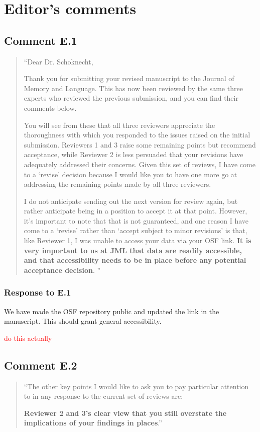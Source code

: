 \documentclass[12pt]{article}
\begin{document}
\section*{Editor's comments} 
\subsection*{Comment E.1}
\begin{quote}
``Dear Dr. Schoknecht,

Thank you for submitting your revised manuscript to the Journal of Memory and Language. This has now been reviewed by the same three experts who reviewed the previous submission, and you can find their comments below.

You will see from these that all three reviewers appreciate the thoroughness with which you responded to the issues raised on the initial submission. Reviewers 1 and 3 raise some remaining points but recommend acceptance, while Reviewer 2 is less persuaded that your revisions have adequately addressed their concerns. Given this set of reviews, I have come to a `revise' decision because I would like you to have one more go at addressing the remaining points made by all three reviewers.

I do not anticipate sending out the next version for review again, but rather anticipate being in a position to accept it at that point. However, it's important to note that that is not guaranteed, and one reason I have come to a `revise' rather than `accept subject to minor revisions' is that, like Reviewer 1, I was unable to access your data via your OSF link. \textbf{It is very important to us at JML that data are readily accessible, and that accessibility needs to be in place before any potential acceptance decision}. 
''
\end{quote}

\subsubsection*{Response to E.1}
We have made the OSF repository public and updated the link in the manuscript. This should grant general accessibility.

\textcolor{red}{do this actually} 


\subsection*{Comment E.2}
\begin{quote}
``The other key points I would like to ask you to pay particular attention to in any response to the current set of reviews are:

\textbf{Reviewer 2 and 3's clear view that you still overstate the implications of your findings in places}.''
\end{quote}
\end{document}
